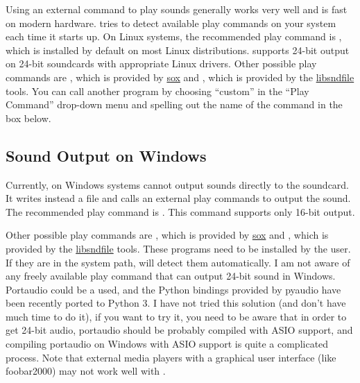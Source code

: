 \documentclass[a4paper,12pt,english]{sphinxmanual}
\begin{document}
Using an external command to play sounds generally works very well and
is fast on modern hardware.  tries to detect available
play commands on your system each time it starts up. On Linux systems,
the recommended play command is , which is installed by default
on most Linux distributions.  supports 24-bit output on 24-bit
soundcards with appropriate Linux drivers. Other possible play commands
are , which is provided by \href{http://sox.sourceforge.net/}{sox}
and , which is provided by the
\href{http://www.mega-nerd.com/libsndfile/}{libsndfile} tools. You can call
another program by choosing “custom” in the “Play Command” drop-down
menu and spelling out the name of the command in the box below.


\subsection{Sound Output on Windows}
\label{engine:sound-output-on-windows}
Currently, on Windows systems  cannot output sounds
directly to the soundcard. It writes instead a  file and calls an
external play commands to output the sound. The recommended play command
is . This command supports only 16-bit output.

Other possible play commands are , which is provided by
\href{http://sox.sourceforge.net/}{sox} and , which is
provided by the \href{http://www.mega-nerd.com/libsndfile/}{libsndfile}
tools. These programs need to be installed by the user. If they are in
the system path,  will detect them automatically. I am
not aware of any freely available play command that can output 24-bit
sound in Windows. Portaudio could be a used, and the Python bindings
provided by pyaudio have been recently ported to Python 3. I have not
tried this solution (and don’t have much time to do it), if you want to
try it, you need to be aware that in order to get 24-bit audio,
portaudio should be probably compiled with ASIO support, and compiling
portaudio on Windows with ASIO support is quite a complicated process.
Note that external media players with a graphical user interface (like
foobar2000) may not work well with .
\end{document}
